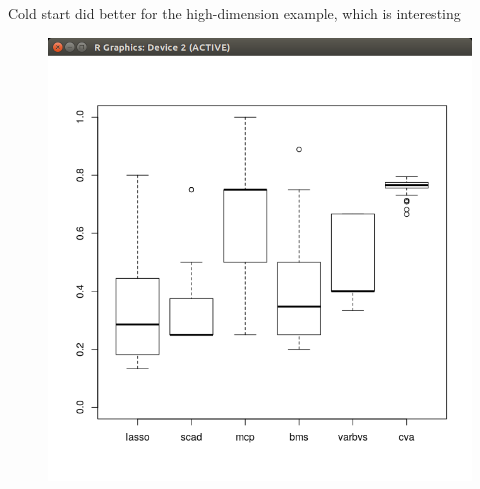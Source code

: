 \documentclass{beamer}
\begin{document}
\begin{frame}{Cold start did better for the high-dimension example, which is interesting}
\begin{figure}
\includegraphics[scale=0.33]{Particle_EM_high_dimensional_cold_start.png}
\end{figure}
\end{frame}
\end{document}
